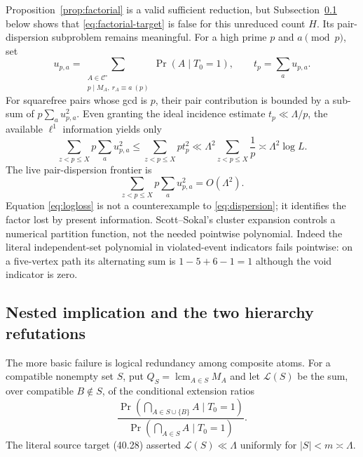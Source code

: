 \documentclass[10pt,reqno]{amsart}
\theoremstyle{definition}
\newcommand{\lcm}{\operatorname {lcm}}
\newcommand{\1}{\mathbf 1}
\begin{document}
Proposition~\ref{prop:factorial} is a valid sufficient reduction, but
Subsection~\ref{sec:nested-wall} below shows that
\eqref{eq:factorial-target} is false for this unreduced count $H$.  Its
pair-dispersion subproblem remains meaningful.  For a high prime $p$ and
$a\pmod p$, set
\[
 u_{p,a}=\sum_{\substack{A\in\mathcal C^\circ\\p\mid M_A,\ r_A\equiv a\ (p)}}
 \Pr(A\mid T_0=1),\qquad t_p=\sum_a u_{p,a}.
\]
For squarefree pairs whose gcd is $p$, their pair contribution is bounded by a sub-sum of
$p\sum_a u_{p,a}^2$.  Even granting the ideal incidence estimate $t_p\ll\Lambda/p$, the available $\ell^1$ information yields only
\begin{equation}\label{eq:logloss}
 \sum_{z<p\leq X}p\sum_a u_{p,a}^2
 \leq\sum_{z<p\leq X}pt_p^2
 \ll\Lambda^2\sum_{z<p\leq X}\frac1p
 \asymp\Lambda^2\log L.
\end{equation}
The live pair-dispersion frontier is
\begin{equation}\label{eq:dispersion}
 \sum_{z<p\leq X}p\sum_a u_{p,a}^2=O(\Lambda^2).
\end{equation}
Equation \eqref{eq:logloss} is not a counterexample to
\eqref{eq:dispersion}; it identifies the factor lost by present information.
Scott--Sokal's cluster expansion \cite{ScottSokal} controls a numerical
partition function, not the needed pointwise polynomial.  Indeed the
literal independent-set polynomial in violated-event indicators fails
pointwise: on a five-vertex path its alternating sum is $1-5+6-1=1$
although the void indicator is zero.

\subsection{Nested implication and the two hierarchy refutations}
\label{sec:nested-wall}
The more basic failure is logical redundancy among composite atoms.  For a
compatible nonempty set $S$, put $Q_S=\lcm_{A\in S}M_A$ and let
$\mathcal L(S)$ be the sum, over compatible $B\notin S$, of the conditional
extension ratios
\[
 \frac{\Pr(\bigcap_{A\in S\cup\{B\}}A\mid T_0=1)}
      {\Pr(\bigcap_{A\in S}A\mid T_0=1)}.
\]
The literal source target (40.28) asserted
$\mathcal L(S)\ll\Lambda$ uniformly for $|S|<m\asymp\Lambda$.
\end{document}
